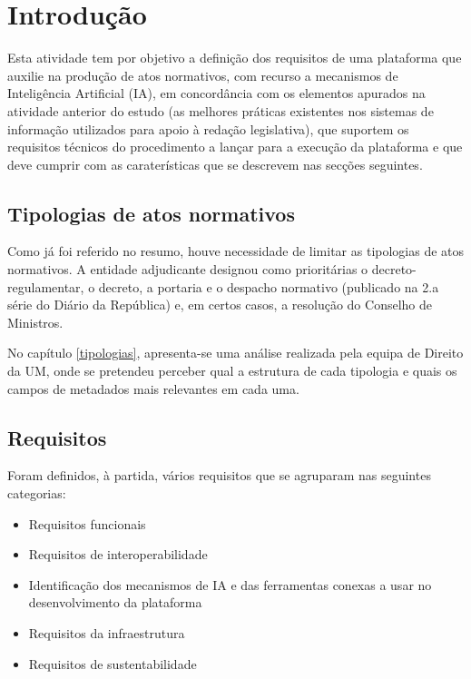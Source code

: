 \chapter{Introdução}

Esta atividade tem por objetivo a definição dos requisitos de uma plataforma
que auxilie na produção de atos normativos, com recurso a mecanismos de 
Inteligência Artificial (IA), em concordância
com os elementos apurados na atividade anterior do estudo 
(as melhores práticas existentes nos
sistemas de informação utilizados para apoio à redação legislativa), 
que suportem os requisitos técnicos do procedimento a lançar para a execução 
da plataforma e que deve cumprir com as caraterísticas que se descrevem nas secções seguintes.

\section{Tipologias de atos normativos}

Como já foi referido no resumo, houve necessidade de limitar as tipologias de atos normativos.
A entidade adjudicante designou como prioritárias o decreto-regulamentar, o decreto, a portaria e o despacho normativo 
(publicado na 2.a série do Diário da República) e, em certos casos, a resolução do Conselho de Ministros.

No capítulo \ref{tipologias}, apresenta-se uma análise realizada pela equipa de Direito da UM, onde se pretendeu perceber 
qual a estrutura de cada tipologia e quais os campos de metadados mais relevantes em cada uma.

\section{Requisitos}

Foram definidos, à partida, vários requisitos que se agruparam nas seguintes categorias:

\begin{itemize}
\item Requisitos funcionais
\item Requisitos de interoperabilidade
\item Identificação dos mecanismos de IA e das ferramentas conexas a usar no desenvolvimento
da plataforma
\item Requisitos da infraestrutura
\item Requisitos de sustentabilidade
\end{itemize}

